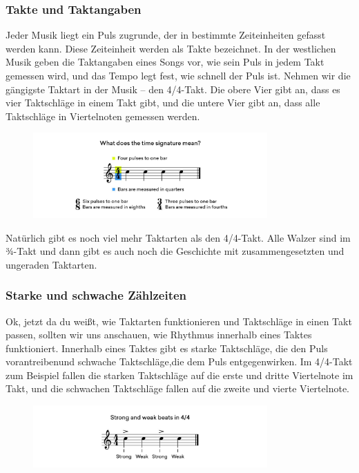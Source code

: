\subsubsection{Takte und Taktangaben}
Jeder Musik liegt ein Puls zugrunde, der in bestimmte Zeiteinheiten gefasst werden kann. Diese Zeiteinheit werden als Takte bezeichnet. In der westlichen Musik geben die Taktangaben eines Songs vor, wie sein Puls in jedem Takt gemessen wird, und das Tempo legt fest, wie schnell der Puls ist. Nehmen wir die gängigste Taktart in der Musik – den 4/4-Takt.
Die obere Vier gibt an, dass es vier Taktschläge in einem Takt gibt, und die untere Vier gibt an, dass alle Taktschläge in Viertelnoten gemessen werden.

\begin{figure}[H]
    \centering
    \includegraphics[width=0.8\textwidth]{images/Rythm_body}
\end{figure}

Natürlich gibt es noch viel mehr Taktarten als den 4/4-Takt. Alle Walzer sind im ¾-Takt und dann gibt es auch noch die Geschichte mit zusammengesetzten und ungeraden Taktarten.

\subsubsection{Starke und schwache Zählzeiten}
Ok, jetzt da du weißt, wie Taktarten funktionieren und Taktschläge in einen Takt passen, sollten wir uns anschauen, wie Rhythmus innerhalb eines Taktes funktioniert. Innerhalb eines Taktes gibt es starke Taktschläge, die den Puls vorantreibenund schwache Taktschläge,die dem Puls entgegenwirken. Im 4/4-Takt zum Beispiel fallen die starken Taktschläge auf die erste und dritte Viertelnote im Takt, und die schwachen Taktschläge fallen auf die zweite und vierte Viertelnote.

\begin{figure}[H]
    \centering
    \includegraphics[width=0.8\textwidth]{images/Rythm_body_2}
\end{figure}

